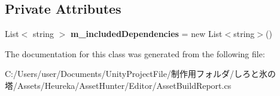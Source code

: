 \subsection*{Private Attributes}
\begin{DoxyCompactItemize}
\item 
\mbox{\label{class_heureka_games_1_1_asset_build_report_a962fab9a3799f287e960e210f4670d76}} 
List$<$ string $>$ {\bfseries m\+\_\+included\+Dependencies} = new List$<$string$>$()
\end{DoxyCompactItemize}


The documentation for this class was generated from the following file\+:\begin{DoxyCompactItemize}
\item 
C\+:/\+Users/user/\+Documents/\+Unity\+Project\+File/制作用フォルダ/しろと氷の塔/\+Assets/\+Heureka/\+Asset\+Hunter/\+Editor/Asset\+Build\+Report.\+cs\end{DoxyCompactItemize}
